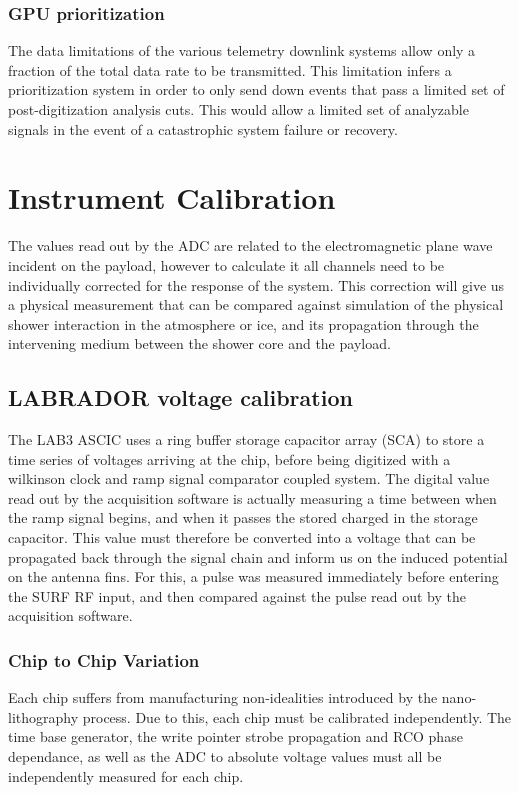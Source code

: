 	\subsection{GPU prioritization}
		The data limitations of the various telemetry downlink systems allow only a fraction of the total data rate to be transmitted.  This limitation infers a prioritization system in order to only send down events that pass a limited set of post-digitization analysis cuts.  This would allow a limited set of analyzable signals in the event of a catastrophic system failure or recovery.
			
\chapter{Instrument Calibration}
	The values read out by the ADC are related to the electromagnetic plane wave incident on the payload, however to calculate it all channels need to be individually corrected for the response of the system.  This correction will give us a physical measurement that can be compared against simulation of the physical shower interaction in the atmosphere or ice, and its propagation through the intervening medium between the shower core and the payload.
\section{LABRADOR voltage calibration}
	
		The LAB3 ASCIC uses a ring buffer storage capacitor array (SCA) to store a time series of voltages arriving at the chip, before being digitized with a wilkinson clock and ramp signal comparator coupled system.  The digital value read out by the acquisition software is actually measuring a time between when the ramp signal begins, and when it passes the stored charged in the storage capacitor.  This value must therefore be converted into a voltage that can be propagated back through the signal chain and inform us on the induced potential on the antenna fins.  For this, a pulse was measured immediately before entering the SURF RF input, and then compared against the pulse read out by the acquisition software.
	\subsection{Chip to Chip Variation}
		Each chip suffers from manufacturing non-idealities introduced by the nano-lithography process.  Due to this, each chip must be calibrated independently.  The time base generator, the write pointer strobe propagation and RCO phase dependance, as well as the ADC to absolute voltage values must all be independently measured for each chip.


